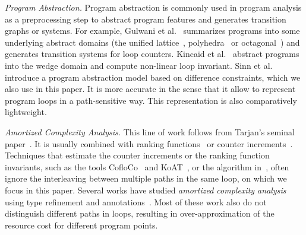 
\emph{Program Abstraction.}
Program abstraction is commonly used in program analysis as a preprocessing step to abstract program features and generates transition graphs or systems. For example, Gulwani et al.~\cite{GulwaniZ10} summarizes programs into some underlying abstract domains (the unified lattice~\cite{CousotH78}, polyhedra~\cite{CousotC77} or octagonal~\cite{Mine06})
and generates transition systems for loop counters. Kincaid et al.~\cite{KincaidCBR18} abstract  programs into the wedge domain and compute non-linear loop invariant.
Sinn et al.~\cite{SinnZV17,SinnZV14}
introduce a program abstraction model based on difference constraints, which we also use in this paper. 
It is more accurate in the sense that it allow to represent program loops in a path-sensitive way.
 This representation is also comparatively lightweight.

\emph{Amortized Complexity Analysis.}
This line of work follows 
from Tarjan's seminal paper~\cite{Tarjan85}. It is usually combined with ranking functions~\cite{BradleyMS05,CookSZ13,Zuleger18} or counter increments~\cite{GulwaniMC09,ZulegerGSV11,AliasDFG10}.
 Techniques that estimate the counter increments or the ranking function invariants, such as the tools CofloCo~\cite{Montoya17,Flores-MontoyaH14,Flores-Montoya16} and KoAT~\cite{BrockschmidtEFFG16,BrockschmidtEFFG14,FalkeKS12,FalkeKS11}, or the algorithm in~\cite{LuCT21}, often ignore the interleaving between multiple paths in the same loop, on which we focus in this paper.
Several works have studied \emph{amortized complexity analysis} using type refinement and annotations~\cite{CraryW00,JostHLH10,CicekBG0H17,RajaniG0021,CarbonneauxHS15}. Most of these work also do not distinguish different paths in loops, resulting in over-approximation of the resource cost for different program points.

